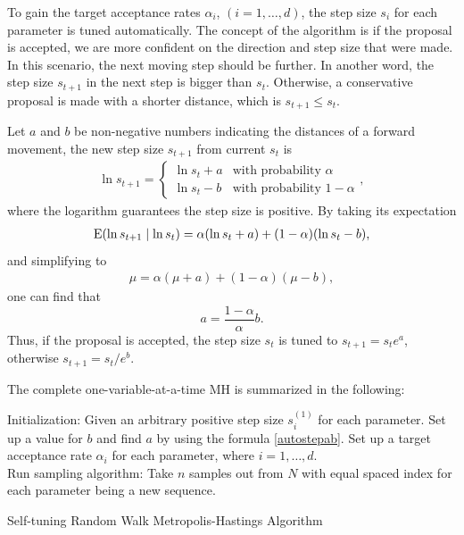 To gain the target acceptance rates $\alpha_i$, $(i = 1, \dots, d)$, the step size $s_i$ for each parameter is tuned automatically. The concept of the algorithm is if the proposal is accepted, we are more confident on the direction and step size that were made. In this scenario, the next moving step should be further. In another word, the step size $s_{t+1}$ in the next step is bigger than $s_t$. Otherwise, a conservative proposal is made with a shorter distance, which is $s_{t+1}\leq s_t$. 

Let $a$ and $b$ be non-negative numbers indicating the distances of a forward movement, the new step size $s_{t+1}$ from current $s_t$ is 
\begin{align}\ln s_{t+1} = 
\begin{cases}
\ln s_t + a & \mbox{with probability } \alpha \\
\ln s_t - b & \mbox{with probability } 1 - \alpha 
\end{cases},
\end{align}
where the logarithm guarantees the step size is positive. 
By taking its expectation  
\begin{align*}
\mathrm{E}(\ln s_{t+1}\mid \ln s_t) = \alpha(\ln s_t+a) + (1-\alpha)(\ln s_t-b), 
\end{align*}
and simplifying to 
\begin{align*}
\mu= \alpha(\mu+a) + (1-\alpha)(\mu-b), 
\end{align*}
one can find that 
\begin{equation}\label{autostepab}
a = \frac{1-\alpha}{\alpha}  b. 
\end{equation}
Thus, if the proposal is accepted, the step size $s_t$ is tuned to $s_{t+1}=s_te^a$, otherwise $s_{t+1}=s_t/e^b$. 

The complete one-variable-at-a-time MH is summarized in the following: 
\begin{algorithm}[h]
Initialization: Given an arbitrary positive step size $s_i^{(1)}$ for each parameter. Set up a value for $b$ and find $a$ by using the formula \eqref{autostepab}. Set up a target acceptance rate $\alpha_i$ for each parameter, where $i = 1,\dots, d$. \\
Run sampling algorithm: 
Take $n$ samples out from $N$ with equal spaced index for each parameter being a new sequence. 
\caption{Self-tuning Random Walk Metropolis-Hastings Algorithm}\label{algoonevarible}
\end{algorithm}


